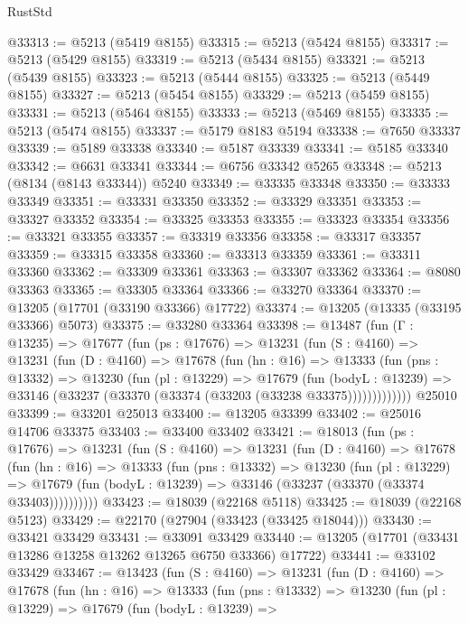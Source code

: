 \begin{lexlean}{RustStd}
\begin{coremodule}
@33313 := @5213 (@5419 @8155)
@33315 := @5213 (@5424 @8155)
@33317 := @5213 (@5429 @8155)
@33319 := @5213 (@5434 @8155)
@33321 := @5213 (@5439 @8155)
@33323 := @5213 (@5444 @8155)
@33325 := @5213 (@5449 @8155)
@33327 := @5213 (@5454 @8155)
@33329 := @5213 (@5459 @8155)
@33331 := @5213 (@5464 @8155)
@33333 := @5213 (@5469 @8155)
@33335 := @5213 (@5474 @8155)
@33337 := @5179 @8183 @5194
@33338 := @7650 @33337
@33339 := @5189 @33338
@33340 := @5187 @33339
@33341 := @5185 @33340
@33342 := @6631 @33341
@33344 := @6756 @33342 @5265
@33348 := @5213 (@8134 (@8143 @33344)) @5240
@33349 := @33335 @33348
@33350 := @33333 @33349
@33351 := @33331 @33350
@33352 := @33329 @33351
@33353 := @33327 @33352
@33354 := @33325 @33353
@33355 := @33323 @33354
@33356 := @33321 @33355
@33357 := @33319 @33356
@33358 := @33317 @33357
@33359 := @33315 @33358
@33360 := @33313 @33359
@33361 := @33311 @33360
@33362 := @33309 @33361
@33363 := @33307 @33362
@33364 := @8080 @33363
@33365 := @33305 @33364
@33366 := @33270 @33364
@33370 := @13205 (@17701 (@33190 @33366) @17722)
@33374 := @13205 (@13335 (@33195 @33366) @5073)
@33375 := @33280 @33364
@33398 := @13487
    (fun (Γ : @13235) =>
    @17677
      (fun (ps : @17676) =>
      @13231
        (fun (S : @4160) =>
        @13231
          (fun (D : @4160) =>
          @17678
            (fun (hn : @16) =>
            @13333
              (fun (pns : @13332) =>
              @13230
                (fun (pl : @13229) =>
                @17679
                  (fun (bodyL : @13239) =>
                  @33146 (@33237 (@33370 (@33374 (@33203 (@33238 @33375)))))))))))))
    @25010
@33399 := @33201 @25013
@33400 := @13205 @33399
@33402 := @25016 @14706 @33375
@33403 := @33400 @33402
@33421 := @18013
    (fun (ps : @17676) =>
    @13231
      (fun (S : @4160) =>
      @13231
        (fun (D : @4160) =>
        @17678
          (fun (hn : @16) =>
          @13333
            (fun (pns : @13332) =>
            @13230
              (fun (pl : @13229) =>
              @17679 (fun (bodyL : @13239) => @33146 (@33237 (@33370 (@33374 @33403))))))))))
@33423 := @18039 (@22168 @5118)
@33425 := @18039 (@22168 @5123)
@33429 := @22170 (@27904 (@33423 (@33425 @18044)))
@33430 := @33421 @33429
@33431 := @33091 @33429
@33440 := @13205 (@17701 (@33431 @13286 @13258 @13262 @13265 @6750 @33366) @17722)
@33441 := @33102 @33429
@33467 := @13423
    (fun (S : @4160) =>
    @13231
      (fun (D : @4160) =>
      @17678
        (fun (hn : @16) =>
        @13333
          (fun (pns : @13332) =>
          @13230
            (fun (pl : @13229) =>
            @17679
              (fun (bodyL : @13239) =>

\end{coremodule}
\end{lexlean}
